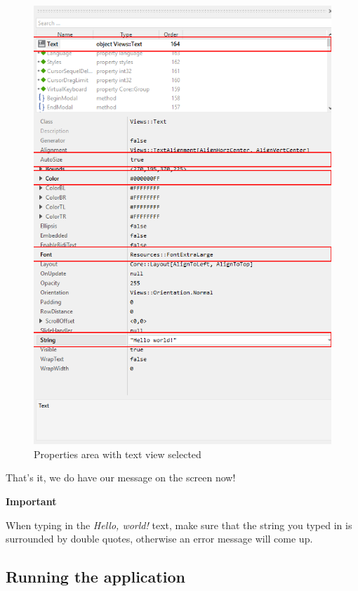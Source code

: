 \documentclass[
  a4paper,
,tablecaptionabove
]{scrbook}
\renewenvironment{quote}{\begin{customblockquote}\list{}{\rightmargin=0em\leftmargin=0em}%
\item\relax\color{blockquote-text}\ignorespaces}{\unskip\unskip\endlist\end{customblockquote}}
\begin{document}
\begin{figure}
\centering
\includegraphics{./../asciidoc/modules/ROOT/assets/images/helloworld/PropertiesWindow.png}
\caption{Properties area with text view selected}
\end{figure}

That's it, we do have our message on the screen now!

\begin{quote}
\textbf{Important}

When typing in the \emph{Hello, world!} text, make sure that the string
you typed in is surrounded by double quotes, otherwise an error message
will come up.
\end{quote}

\hypertarget{_running_the_application}{%
\subsection{Running the application}\label{_running_the_application}}
\end{document}
